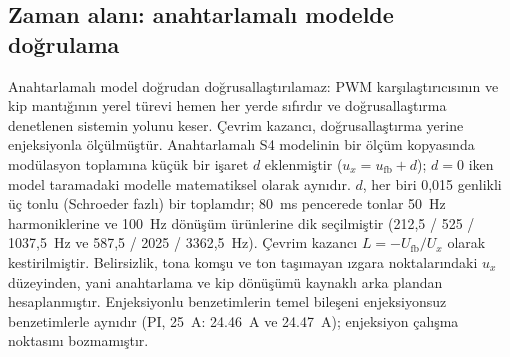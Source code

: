 \subsection{Zaman alanı: anahtarlamalı modelde doğrulama}

Anahtarlamalı model doğrudan doğrusallaştırılamaz: PWM karşılaştırıcısının ve kip mantığının yerel türevi hemen her yerde sıfırdır ve doğrusallaştırma denetlenen sistemin yolunu keser. Çevrim kazancı, doğrusallaştırma yerine enjeksiyonla ölçülmüştür. Anahtarlamalı S4 modelinin bir ölçüm kopyasında modülasyon toplamına küçük bir işaret $d$ eklenmiştir ($u_x=u_{\mathrm{fb}}+d$); $d=0$ iken model taramadaki modelle matematiksel olarak aynıdır. $d$, her biri 0,015 genlikli üç tonlu (Schroeder fazlı) bir toplamdır; \SI{80}{\milli\second} pencerede tonlar \SI{50}{\hertz} harmoniklerine ve \SI{100}{\hertz} dönüşüm ürünlerine dik seçilmiştir (212,5 / 525 / 1037,5~Hz ve 587,5 / 2025 / 3362,5~Hz). Çevrim kazancı $L=-U_{\mathrm{fb}}/U_x$ olarak kestirilmiştir. Belirsizlik, tona komşu ve ton taşımayan ızgara noktalarındaki $u_x$ düzeyinden, yani anahtarlama ve kip dönüşümü kaynaklı arka plandan hesaplanmıştır. Enjeksiyonlu benzetimlerin temel bileşeni enjeksiyonsuz benzetimlerle aynıdır (PI, \SI{25}{\ampere}: \SI{24.46}{\ampere} ve \SI{24.47}{\ampere}); enjeksiyon çalışma noktasını bozmamıştır.

